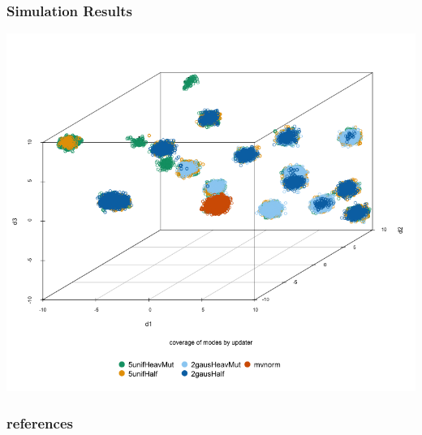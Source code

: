 \documentclass{beamer}\usepackage[]{graphicx}\usepackage[]{color}
\begin{document}
\begin{frame}
  \frametitle{Simulation Results}
  \vspace{-.6in}
  \begin{center}
      \includegraphics[scale=0.35]{figure/final_plot5.png}
  \end{center}
\end{frame}

\nocite{Geyer:1992,Hastings:1970,Liang:2000,Liang:2011,Metropolis:1953}
\begin{frame}[allowframebreaks]
  \frametitle{references}
   
\end{frame}
\end{document}
